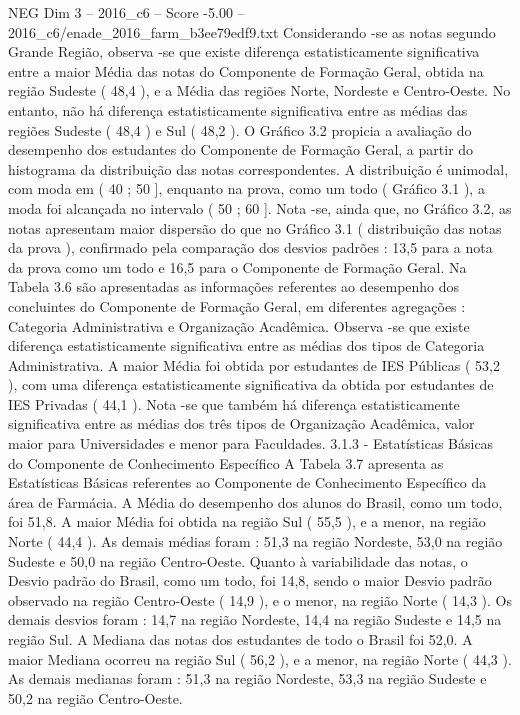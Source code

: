 \begin{textsample}{NEG Dim 3 – 2016\_c6 – Score -5.00 – 2016\_c6/enade\_2016\_farm\_b3ee79edf9.txt}
Considerando -se as notas segundo Grande Região, observa -se que existe diferença estatisticamente significativa entre a maior Média das notas do Componente de Formação Geral, obtida na região Sudeste ( 48,4 ), e a Média das regiões Norte, Nordeste e Centro-Oeste.
No entanto, não há diferença estatisticamente significativa entre as médias das regiões Sudeste ( 48,4 ) e Sul ( 48,2 ).
O Gráfico 3.2 propicia a avaliação do desempenho dos estudantes do Componente de Formação Geral, a partir do histograma da distribuição das notas correspondentes.
A distribuição é unimodal, com moda em ( 40 ; 50 ], enquanto na prova, como um todo ( Gráfico 3.1 ), a moda foi alcançada no intervalo ( 50 ; 60 ].
Nota -se, ainda que, no Gráfico 3.2, as notas apresentam maior dispersão do que no Gráfico 3.1 ( distribuição das notas da prova ), confirmado pela comparação dos desvios padrões : 13,5 para a nota da prova como um todo e 16,5 para o Componente de Formação Geral.
Na Tabela 3.6 são apresentadas as informações referentes ao desempenho dos concluintes do Componente de Formação Geral, em diferentes agregações : Categoria Administrativa e Organização Acadêmica.
Observa -se que existe diferença estatisticamente significativa entre as médias dos tipos de Categoria Administrativa.
A maior Média foi obtida por estudantes de IES Públicas ( 53,2 ), com uma diferença estatisticamente significativa da obtida por estudantes de IES Privadas ( 44,1 ).
Nota -se que também há diferença estatisticamente significativa entre as médias dos três tipos de Organização Acadêmica, valor maior para Universidades e menor para Faculdades. 3.1.3 - Estatísticas Básicas do Componente de Conhecimento Específico A Tabela 3.7 apresenta as Estatísticas Básicas referentes ao Componente de Conhecimento Específico da área de Farmácia.
A Média do desempenho dos alunos do Brasil, como um todo, foi 51,8.
A maior Média foi obtida na região Sul ( 55,5 ), e a menor, na região Norte ( 44,4 ).
As demais médias foram : 51,3 na região Nordeste, 53,0 na região Sudeste e 50,0 na região Centro-Oeste.
Quanto à variabilidade das notas, o Desvio padrão do Brasil, como um todo, foi 14,8, sendo o maior Desvio padrão observado na região Centro-Oeste ( 14,9 ), e o menor, na região Norte ( 14,3 ).
Os demais desvios foram : 14,7 na região Nordeste, 14,4 na região Sudeste e 14,5 na região Sul.
A Mediana das notas dos estudantes de todo o Brasil foi 52,0.
A maior Mediana ocorreu na região Sul ( 56,2 ), e a menor, na região Norte ( 44,3 ).
As demais medianas foram : 51,3 na região Nordeste, 53,3 na região Sudeste e 50,2 na região Centro-Oeste.

\end{textsample}
